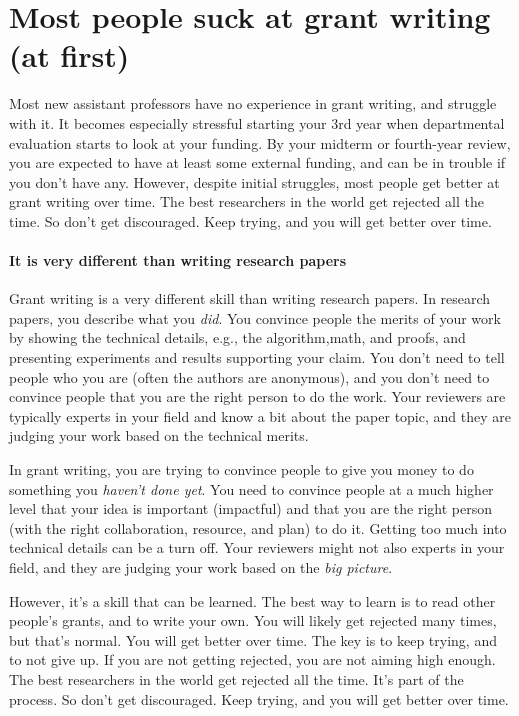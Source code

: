 \documentclass[oneside,11pt,dvipsnames]{book}
\begin{document}
\section{Most people suck at grant writing (at first)} Most new assistant professors have no experience in grant writing, and struggle with it. It becomes especially stressful starting your 3rd year when departmental evaluation starts to look at your funding. By your midterm or fourth-year review, you are expected to have at least some external funding, and can be in trouble if you don't have any. However, despite initial struggles, most people get better at grant writing over time.  The best researchers in the world get rejected all the time. So don't get discouraged.  Keep trying, and you will get better over time.




\paragraph{It is very different than writing research papers} Grant writing is a very different skill than writing research papers.  In research papers, you describe what you \emph{did}. You convince people the merits of your work by showing the technical details, e.g., the algorithm,math, and proofs, and presenting experiments and results supporting your claim. You don't need to tell people who you are (often the authors are anonymous), and you don't need to convince people that you are the right person to do the work.  Your reviewers are typically experts in your field and know a bit about the paper topic, and they are judging your work based on the technical merits.

In grant writing, you are trying to convince people to give you money to do something you \emph{haven't done yet}.  You need to convince people at a much higher level that your idea is important (impactful) and that you are the right person (with the right collaboration, resource, and plan) to do it. Getting too much into technical details can be a turn off.  Your reviewers might not also experts in your field, and they are judging your work based on the \emph{big picture}. 


However, it's a skill that can be learned.  The best way to learn is to read other people's grants, and to write your own.  You will likely get rejected many times, but that's normal.  You will get better over time.  The key is to keep trying, and to not give up.  If you are not getting rejected, you are not aiming high enough.  The best researchers in the world get rejected all the time.  It's part of the process.  So don't get discouraged.  Keep trying, and you will get better over time.
\end{document}
